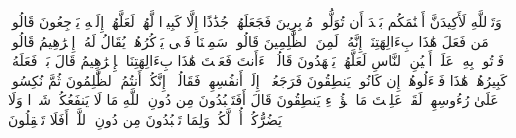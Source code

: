 \stopbuffer
\startbuffer[\q:21:57]
وَتَٱللَّهِ لَأَكِیدَنَّ أَصۡنَٰمَكُم بَعۡدَ أَن تُوَلُّوا۟ مُدۡبِرِینَ%
\stopbuffer
\startbuffer[\q:21:58]
فَجَعَلَهُمۡ جُذَٰذًا إِلَّا كَبِیرࣰا لَّهُمۡ لَعَلَّهُمۡ إِلَیۡهِ یَرۡجِعُونَ%
\stopbuffer
\startbuffer[\q:21:59]
قَالُوا۟ مَن فَعَلَ هَٰذَا بِءَالِهَتِنَاۤ إِنَّهُۥ لَمِنَ ٱلظَّٰلِمِینَ%
\stopbuffer
\startbuffer[\q:21:60]
قَالُوا۟ سَمِعۡنَا فَتࣰى یَذۡكُرُهُمۡ یُقَالُ لَهُۥۤ إِبۡرَٰهِیمُ%
\stopbuffer
\startbuffer[\q:21:61]
قَالُوا۟ فَأۡتُوا۟ بِهِۦ عَلَىٰۤ أَعۡیُنِ ٱلنَّاسِ لَعَلَّهُمۡ یَشۡهَدُونَ%
\stopbuffer
\startbuffer[\q:21:62]
قَالُوۤا۟ ءَأَنتَ فَعَلۡتَ هَٰذَا بِءَالِهَتِنَا یَٰۤإِبۡرَٰهِیمُ%
\stopbuffer
\startbuffer[\q:21:63]
قَالَ بَلۡ فَعَلَهُۥ كَبِیرُهُمۡ هَٰذَا فَسۡءَلُوهُمۡ إِن كَانُوا۟ یَنطِقُونَ%
\stopbuffer
\startbuffer[\q:21:64]
فَرَجَعُوۤا۟ إِلَىٰۤ أَنفُسِهِمۡ فَقَالُوۤا۟ إِنَّكُمۡ أَنتُمُ ٱلظَّٰلِمُونَ%
\stopbuffer
\startbuffer[\q:21:65]
ثُمَّ نُكِسُوا۟ عَلَىٰ رُءُوسِهِمۡ لَقَدۡ عَلِمۡتَ مَا هَٰۤؤُلَاۤءِ یَنطِقُونَ%
\stopbuffer
\startbuffer[\q:21:66]
قَالَ أَفَتَعۡبُدُونَ مِن دُونِ ٱللَّهِ مَا لَا یَنفَعُكُمۡ شَیۡءࣰا وَلَا یَضُرُّكُمۡ%
\stopbuffer
\startbuffer[\q:21:67]
أُفࣲّ لَّكُمۡ وَلِمَا تَعۡبُدُونَ مِن دُونِ ٱللَّهِۚ أَفَلَا تَعۡقِلُونَ%
\stopbuffer
